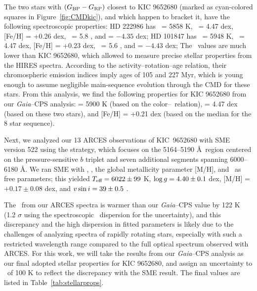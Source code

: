 The two stars with $(G_{\rm BP} - G_{\rm RP})$ closest to KIC 9652680
(marked as cyan-colored squares in Figure~\ref{fig:CMDkic}),
and which happen to bracket it, have the following spectroscopic properties: 
HD 222986 has \teff\ = 5858 K, \logg\ = 4.47 dex, 
[Fe/H] = +0.26 dex, \vsini\ = 5.8 \kms, 
and \logrprime = $-4.35$ dex; 
HD 101847 has \teff\ = 5948 K, \logg\ = 4.47 dex, 
[Fe/H] = +0.23 dex, \vsini\ = 5.6 \kms, 
and \logrprime = $-4.43$ dex; 
The \vsini\ values are much lower than KIC 9652680, 
which allowed \citet{Brewer2016} to measure 
precise stellar properties from the HIRES spectra.
According to the \citet{Mamajek2008} 
activity--rotation--age relation, 
their chromospheric emission indices 
imply ages of 105 and 227 Myr, 
which is young enough to assume negligible 
main-sequence evolution through the CMD for these stars.
From this analysis, 
we find the following properties 
for KIC 9652680 from our 
\textit{Gaia}--CPS analysis: 
\teff = 5900 K (based on the color--\teff\ relation), 
\logg = 4.47 dex (based on these two stars), and 
[Fe/H] = +0.21 dex (based on the median for the 8 star sequence).

Next, we analyzed our 13 ARCES observations of KIC~9652680 with SME version 522
using the \citet{Valenti2005} strategy, 
which focuses on 
the 5164--5190 \AA\ region centered on the 
pressure-sensitive  $b$ triplet 
and seven additional segments spanning 6000--6180 \AA. 
We 
ran SME with \teff, \logg, the global metallicity parameter [M/H], 
and \vsini\ as free parameters; 
this yielded 
$T_{\mbox{\scriptsize eff}} = 6022 \pm 99$ K, %
$\log g = 4.40 \pm 0.1$ dex, %
[M/H] = $+0.17 \pm 0.08$ dex, and %
$v \sin i = 39 \pm 0.5$ \kms. %

The \teff\ from our ARCES spectra is warmer than our
\textit{Gaia}--CPS value by 122 K 
(1.2 $\sigma$ using the spectroscopic \teff\ dispersion for the uncertainty), 
and this discrepancy and the high dispersion in fitted parameters 
is likely 
due to the challenges 
of analyzing spectra of 
rapidly rotating stars, 
especially with such a restricted wavelength range 
compared to the full optical spectrum observed with 
ARCES.
For this work, 
we will take the results from our 
\textit{Gaia}--CPS analysis as our 
final adopted stellar properties for KIC 9652680, 
and assign an uncertainty to \teff\ of 100 K to 
reflect the discrepancy with the SME result. 
The final values are listed in Table~\ref{tab:stellarprops}.



